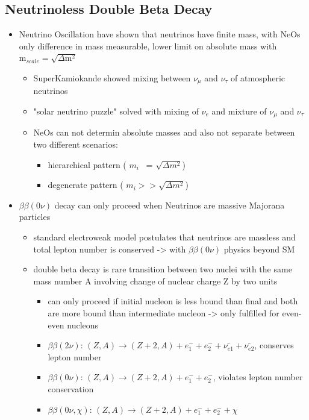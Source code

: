 \documentclass[encoding=utf8,british]{tumphthesis}
\begin{document}
\subsection{Neutrinoless Double Beta Decay}
\label{sec:NDBD}
\begin{itemize}
\item Neutrino Oscillation have shown that neutrinos have finite mass, with NeOs only difference in mass measurable, lower limit on absolute mass with \(\mathrm{m}_{scale} = \sqrt{\Delta \mathrm{m}^2}\)
\begin{itemize}
\item SuperKamiokande showed mixing between \(\nu_\mu\) and \(\nu_\tau\) of atmospheric neutrinos
\item "solar neutrino puzzle" solved with mixing of \(\nu_e\) and mixture of \(\nu_\mu\) and \(\nu_\tau\)
\item NeOs can not determin absolute masses and also not separate between two different scenarios:
\begin{itemize}
\item hierarchical pattern ( \(m_i\)  ~= \(\sqrt{\Delta m^2}\))
\item degenerate pattern ( \(m_i >> \sqrt{\Delta m^2}\))
\end{itemize}
\end{itemize}
\item \(\beta\beta(0\nu)\) decay can only proceed when Neutrinos are massive Majorana particles
\begin{itemize}
\item standard electroweak model postulates that neutrinos are massless and total lepton number is conserved -> with \(\beta\beta(0\nu)\) physics beyond SM
\item double beta decay is rare transition between two nuclei with the same mass number A involving change of nuclear charge Z by two units
\begin{itemize}
\item can only proceed if initial nucleon is less bound than final and both are more bound than intermediate nucleon -> only fulfilled for even-even nucleons
\item \(\beta\beta(2\nu)\): \( (Z,A) \rightarrow (Z + 2, A) + e^-_1 + e^-_2 + \bar{\nu_{e1}} + \bar{\nu_{e2}} \), conserves lepton number
\item \(\beta\beta(0\nu)\): \( (Z,A) \rightarrow (Z + 2, A) + e^-_1 + e^-_2\), violates lepton number conservation
\item \(\beta\beta(0\nu, \chi)\): \((Z,A) \rightarrow (Z + 2, A) + e^-_1 + e^-_2 + \chi \)

\end{itemize}
\end{itemize}
\end{itemize}
\end{document}
